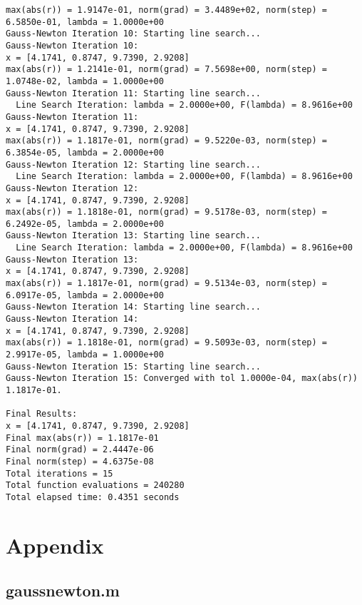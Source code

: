 \documentclass[12pt, a4paper]{article}
\begin{document}
\begin{Verbatim}[frame=single, rulecolor=\color{blue}]
max(abs(r)) = 1.9147e-01, norm(grad) = 3.4489e+02, norm(step) = 6.5850e-01, lambda = 1.0000e+00
Gauss-Newton Iteration 10: Starting line search...
Gauss-Newton Iteration 10:
x = [4.1741, 0.8747, 9.7390, 2.9208]
max(abs(r)) = 1.2141e-01, norm(grad) = 7.5698e+00, norm(step) = 1.0748e-02, lambda = 1.0000e+00
Gauss-Newton Iteration 11: Starting line search...
  Line Search Iteration: lambda = 2.0000e+00, F(lambda) = 8.9616e+00
Gauss-Newton Iteration 11:
x = [4.1741, 0.8747, 9.7390, 2.9208]
max(abs(r)) = 1.1817e-01, norm(grad) = 9.5220e-03, norm(step) = 6.3854e-05, lambda = 2.0000e+00
Gauss-Newton Iteration 12: Starting line search...
  Line Search Iteration: lambda = 2.0000e+00, F(lambda) = 8.9616e+00
Gauss-Newton Iteration 12:
x = [4.1741, 0.8747, 9.7390, 2.9208]
max(abs(r)) = 1.1818e-01, norm(grad) = 9.5178e-03, norm(step) = 6.2492e-05, lambda = 2.0000e+00
Gauss-Newton Iteration 13: Starting line search...
  Line Search Iteration: lambda = 2.0000e+00, F(lambda) = 8.9616e+00
Gauss-Newton Iteration 13:
x = [4.1741, 0.8747, 9.7390, 2.9208]
max(abs(r)) = 1.1817e-01, norm(grad) = 9.5134e-03, norm(step) = 6.0917e-05, lambda = 2.0000e+00
Gauss-Newton Iteration 14: Starting line search...
Gauss-Newton Iteration 14:
x = [4.1741, 0.8747, 9.7390, 2.9208]
max(abs(r)) = 1.1818e-01, norm(grad) = 9.5093e-03, norm(step) = 2.9917e-05, lambda = 1.0000e+00
Gauss-Newton Iteration 15: Starting line search...
Gauss-Newton Iteration 15: Converged with tol 1.0000e-04, max(abs(r)) 1.1817e-01.

Final Results:
x = [4.1741, 0.8747, 9.7390, 2.9208]
Final max(abs(r)) = 1.1817e-01
Final norm(grad) = 2.4447e-06
Final norm(step) = 4.6375e-08
Total iterations = 15
Total function evaluations = 240280
Total elapsed time: 0.4351 seconds
\end{Verbatim}

\pagebreak




\section*{Appendix}

\subsection*{gaussnewton.m}

\end{document}
